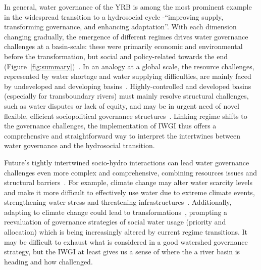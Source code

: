 In general, water governance of the YRB is among the most prominent example in the widespread transition to a hydrosocial cycle -``improving supply, transforming governance, and enhancing adaptation''.
With each dimension changing gradually, the emergence of different regimes drives water governance challenges at a basin-scale: these were primarily economic and environmental before the transformation, but social and policy-related towards the end (Figure~\ref{fig:summary})~\cite{singh2019,porcher2019}.
In an analogy at a global scale, the resource challenges, represented by water shortage and water supplying difficulties, are mainly faced by undeveloped and developing basins~\cite{allan2019,speed2013,liu2012}.
Highly-controlled and developed basins (especially for transboundary rivers) must mainly resolve structural challenges, such as water disputes or lack of equity, and may be in urgent need of novel flexible, efficient sociopolitical governance structures~\cite{unep-dhi2016,mirumachi2015}.
Linking regime shifts to the governance challenges, the implementation of IWGI thus offers a comprehensive and straightforward way to interpret the intertwines between water governance and the hydrosocial transition.

Future's tightly intertwined socio-hydro interactions can lead water governance challenges even more complex and comprehensive, combining resources issues and structural barriers~\cite{huggins2022a}.
For example, climate change may alter water scarcity levels and make it more difficult to effectively use water due to extreme climate events, strengthening water stress and threatening infrastructures~\cite{liu2017, dibaldassarre2019}.
Additionally, adapting to climate change could lead to transformations~\cite{sachs2019,barnes2020}, prompting a reevaluation of governance strategies of social water usage (priority and allocation) which is being increasingly altered by current regime transitions.
It may be difficult to exhaust what is considered in a good watershed governance strategy, but the IWGI at least gives us a sense of where the a river basin is heading and how challenged.

